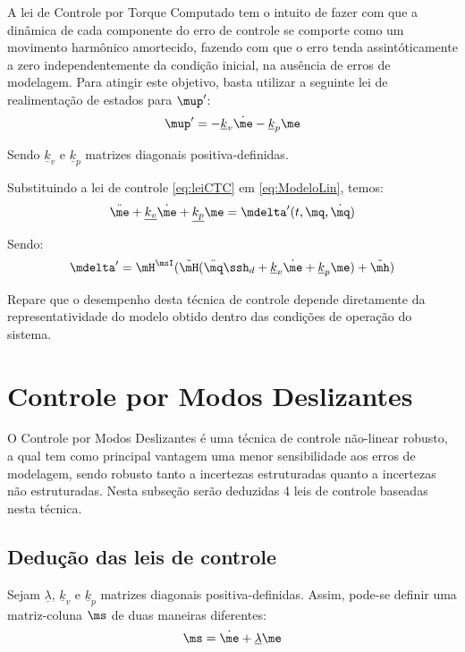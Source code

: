\documentclass[]{politex}
\begin{document}
A lei de Controle por Torque Computado tem o intuito de fazer com que a dinâmica de cada componente do erro de controle se comporte como um movimento harmônico amortecido, fazendo com que o erro tenda assintóticamente a zero independentemente da condição inicial, na ausência de erros de modelagem. Para atingir este objetivo, basta utilizar a seguinte lei de realimentação de estados para $\mup'$:
\begin{equation} \label{eq:leiCTC}
\mup' = -\underline{k}_v \dot{\me} - \underline{k}_p \me
\end{equation}

Sendo $\underline{k}_v$ e $\underline{k}_p$ matrizes diagonais positiva-definidas.

Substituindo a lei de controle \eqref{eq:leiCTC} em \eqref{eq:ModeloLin}, temos:
\begin{equation}
\ddot{\me} + \underline{k_v} \dot{\me} + \underline{k_p} \me = \mdelta'(t,\mq,\dot{\mq})
\end{equation}

Sendo:
\begin{equation}
\mdelta' = \mH^\msI( \tilde{\mH}(\ddot{\mq}\ssh_d + \underline{k}_v \dot{\me} + \underline{k}_p \me ) + \tilde{\mh} )
\end{equation}

Repare que o desempenho desta técnica de controle depende diretamente da representatividade do modelo obtido dentro das condições de operação do sistema. 


\section{Controle por Modos Deslizantes} \label{sec:CMD}

O Controle por Modos Deslizantes é uma técnica de controle não-linear robusto, a qual tem como principal vantagem uma menor sensibilidade aos erros de modelagem, sendo robusto tanto a incertezas estruturadas quanto a incertezas não estruturadas. Nesta subseção serão deduzidas 4 leis de controle baseadas nesta técnica.

\subsection{Dedução das leis de controle}

Sejam $\underline{\lambda}$, $\underline{k}_v$ e $\underline{k}_p$ matrizes diagonais positiva-definidas. Assim, pode-se definir uma matriz-coluna $\ms$ de duas maneiras diferentes:
\begin{equation} \label{eq:SlidingSurfaces}
\ms = \dot{\me} + \underline{\lambda}\me
\end{equation}
\end{document}
